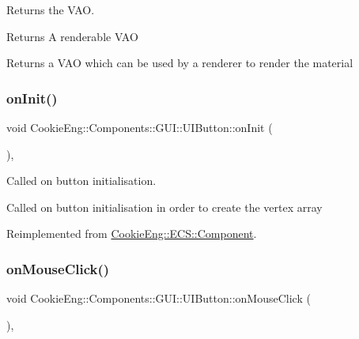 Returns the V\+AO. 

\begin{DoxyReturn}{Returns}
A renderable V\+AO
\end{DoxyReturn}
Returns a V\+AO which can be used by a renderer to render the material \mbox{\label{class_cookie_eng_1_1_components_1_1_g_u_i_1_1_u_i_button_ad045368b7a595ddaa70cc18112f98221}} 
\subsubsection{\texorpdfstring{on\+Init()}{onInit()}}
{\footnotesize\ttfamily void Cookie\+Eng\+::\+Components\+::\+G\+U\+I\+::\+U\+I\+Button\+::on\+Init (\begin{DoxyParamCaption}{ }\end{DoxyParamCaption})\hspace{0.3cm}{\ttfamily [override]}, {\ttfamily [virtual]}}



Called on button initialisation. 

Called on button initialisation in order to create the vertex array 

Reimplemented from \hyperlink{class_cookie_eng_1_1_e_c_s_1_1_component_a4b02b630558005a9c4723cf15b8b03d6}{Cookie\+Eng\+::\+E\+C\+S\+::\+Component}.

\mbox{\label{class_cookie_eng_1_1_components_1_1_g_u_i_1_1_u_i_button_a236c38fd81450e39f138f06a8b2003b0}} 
\subsubsection{\texorpdfstring{on\+Mouse\+Click()}{onMouseClick()}}
{\footnotesize\ttfamily void Cookie\+Eng\+::\+Components\+::\+G\+U\+I\+::\+U\+I\+Button\+::on\+Mouse\+Click (\begin{DoxyParamCaption}{ }\end{DoxyParamCaption})\hspace{0.3cm}{\ttfamily [override]}, {\ttfamily [virtual]}}



